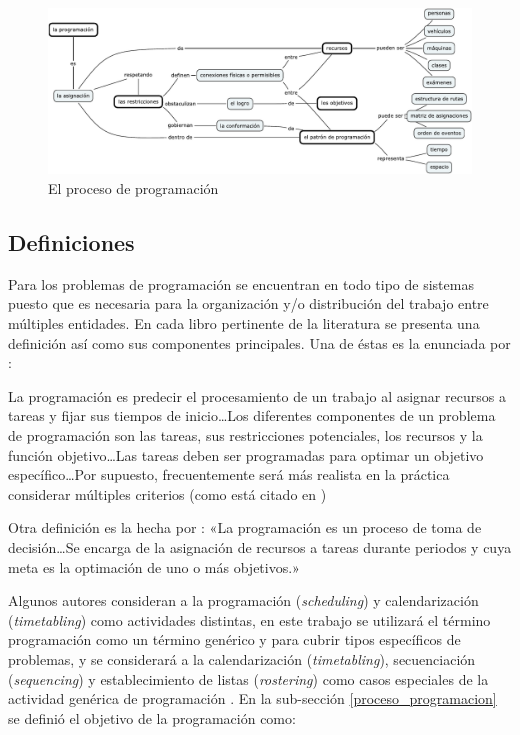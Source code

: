 \documentclass[spanish,draft,12pt,headsepline,footsepline,paper=letter]{scrreprt}
\renewenvironment{quotation}{\list{}{\leftmargin=0.25in}\item[]}{\endlist}
\begin{document}
\begin{figure}[hbtp]
\centering
\includegraphics[width=\textwidth]{media/scheduling_process.pdf}
\caption[El proceso de programación]{El proceso de programación}
\label{fig:scheduling_process}
\end{figure}

\subsection{Definiciones}
\label{Definiciones}

Para \citet[p.~5]{TKindt2002} los problemas de programación se encuentran en todo tipo de sistemas puesto que es necesaria para la organización y/o distribución del trabajo entre múltiples entidades. En cada libro pertinente de la literatura se presenta una definición así como sus componentes principales. Una de éstas es la enunciada por \citet{carlier1988problemes}: 
\begin{quotation}
La programación es predecir el procesamiento de un trabajo al asignar recursos a tareas y fijar sus tiempos de inicio\dots Los diferentes componentes de un problema de programación son las tareas, sus restricciones potenciales, los recursos y la función objetivo\dots Las tareas deben ser programadas para optimar un objetivo específico\dots Por supuesto, frecuentemente será más realista en la práctica considerar múltiples criterios (como está citado en \citealp[p.~6]{TKindt2002}) 
\end{quotation}

Otra definición es la hecha por \citet[p.~1]{Pinedo1995}: «La programación es un proceso de toma de decisión\dots  Se encarga de la asignación de recursos a tareas durante periodos y cuya meta es la optimación de uno o más objetivos.»

Algunos autores consideran a la programación (\textit{scheduling}) y calendarización (\textit{timetabling}) como actividades distintas, en este trabajo se utilizará el término programación como un término genérico y para cubrir tipos específicos de problemas, y se considerará a la calendarización (\textit{timetabling}), secuenciación (\textit{sequencing}) y establecimiento de listas (\textit{rostering}) como casos especiales de la actividad genérica de programación \citep[p.~47]{wren95scheduling-timetabling}.
%
En la sub-sección \ref{proceso_programacion} se definió el objetivo de la programación como:
\end{document}
